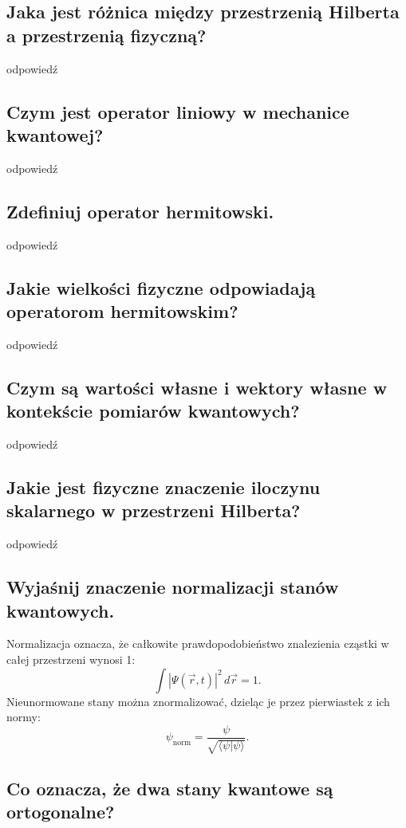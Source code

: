 \subsection{Jaka jest różnica między przestrzenią Hilberta a przestrzenią fizyczną?}

odpowiedź

\subsection{Czym jest operator liniowy w mechanice kwantowej?}

odpowiedź

\subsection{Zdefiniuj operator hermitowski.}

odpowiedź

\subsection{Jakie wielkości fizyczne odpowiadają operatorom hermitowskim?}

odpowiedź

\subsection{Czym są wartości własne i wektory własne w kontekście pomiarów kwantowych?}

odpowiedź

\subsection{Jakie jest fizyczne znaczenie iloczynu skalarnego w przestrzeni Hilberta?}

odpowiedź

\subsection{Wyjaśnij znaczenie normalizacji stanów kwantowych.}

Normalizacja oznacza, że całkowite prawdopodobieństwo znalezienia cząstki w całej przestrzeni wynosi 1:
\[
\int |\Psi(\vec{r}, t)|^2 \, d\vec{r} = 1.
\]
Nieunormowane stany można znormalizować, dzieląc je przez pierwiastek z ich normy:  
\[
\psi_{\text{norm}} = \frac{\psi}{\sqrt{\langle \psi | \psi \rangle}}.
\]

\subsection{Co oznacza, że dwa stany kwantowe są ortogonalne?}

